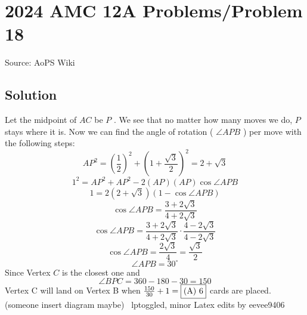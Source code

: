 \documentclass[12pt]{article}
\begin{document}
\section*{{2024 AMC 12A Problems/Problem 18}}
Source: AoPS Wiki

\subsection*{Solution}
Let the midpoint of $AC$ be $P$ . We see that no matter how many moves we do, $P$ stays where it is. Now we can find the angle of rotation ( $\angle APB$ ) per move with the following steps: \[AP^2=(\frac{1}{2})^2+(1+\frac{\sqrt{3}}{2})^2=2+\sqrt{3}\] \[1^2=AP^2+AP^2-2(AP)(AP)\cos\angle APB\] \[1=2(2+\sqrt{3})(1-\cos\angle APB)\] \[\cos\angle APB=\frac{3+2\sqrt{3}}{4+2\sqrt{3}}\] \[\cos\angle APB=\frac{3+2\sqrt{3}}{4+2\sqrt{3}}\cdot\frac{4-2\sqrt{3}}{4-2\sqrt{3}}\] \[\cos\angle APB=\frac{2\sqrt{3}}{4}=\frac{\sqrt{3}}{2}\] \[\angle APB=30^\circ\] Since Vertex $C$ is the closest one and \[\angle BPC=360-180-30=150\] Vertex C will land on Vertex B when $\frac{150}{30}+1=\fbox{(A) 6}$ cards are placed. (someone insert diagram maybe) ~lptoggled, minor Latex edits by eevee9406
\end{document}

